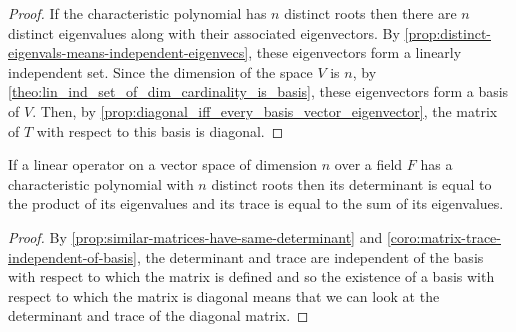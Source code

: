 \documentclass[../MathsNotesBase.tex]{subfiles}
\begin{document}
{	
		\bigskip
		\begin{proof}
			If the characteristic polynomial has $n$ distinct roots then there are $n$ distinct eigenvalues along with their associated eigenvectors. By \autoref{prop:distinct-eigenvals-means-independent-eigenvecs}, these eigenvectors form a linearly independent set. Since the dimension of the space $V$ is $n$, by \autoref{theo:lin_ind_set_of_dim_cardinality_is_basis}, these eigenvectors form a basis of $V$. Then, by \autoref{prop:diagonal_iff_every_basis_vector_eigenvector}, the matrix of $T$ with respect to this basis is diagonal.
		\end{proof}
	
		\bigskip{}
		\begin{corollary}\label{coro:matrix-with-eigenbasis-has-trace-equal-to-sum-of-eigenvalues-and-determinant-equal-to-product}
			If a linear operator on a vector space of dimension $n$ over a field $F$ has a characteristic polynomial with $n$ distinct roots then its determinant is equal to the product of its eigenvalues and its trace is equal to the sum of its eigenvalues.
		\end{corollary}
		\begin{proof}
			By \autoref{prop:similar-matrices-have-same-determinant} and \autoref{coro:matrix-trace-independent-of-basis}, the determinant and trace are independent of the basis with respect to which the matrix is defined and so the existence of a basis with respect to which the matrix is diagonal means that we can look at the determinant and trace of the diagonal matrix.
		\end{proof}
	
}
\end{document}
